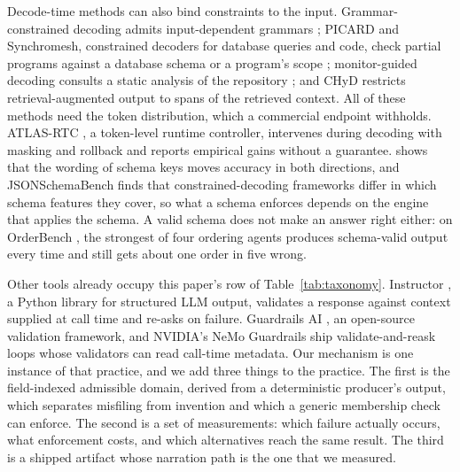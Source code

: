 \documentclass[10pt,twocolumn]{article}
\begin{document}
Decode-time methods can also bind constraints to the input.
Grammar-constrained decoding admits input-dependent grammars \citep{gcd}; PICARD and Synchromesh, constrained decoders for database queries and code, check partial
programs against a database schema or a program's
scope \citep{scholak2021picard,poesia2022synchromesh}; monitor-guided decoding
consults a static analysis of the repository \citep{agrawal2023mgd}; and
CHyD \citep{signe2026chyd} restricts retrieval-augmented output to spans of the
retrieved context. All of these methods need the token distribution, which a
commercial endpoint withholds. ATLAS-RTC \citep{cruz2026atlasrtc}, a
token-level runtime controller, intervenes during decoding with masking and
rollback and reports empirical gains without a guarantee. \citet{le2026schemakey} shows that the
wording of schema keys moves accuracy in both directions, and
JSONSchemaBench \citep{geng2025jsonschemabench} finds that constrained-decoding
frameworks differ in which schema features they cover, so what a schema
enforces depends on the engine that applies the schema. A valid schema does not
make an answer right either: on OrderBench \citep{li2026orderbench}, the
strongest of four ordering agents produces schema-valid output every time and
still gets about one order in five wrong.

Other tools already occupy this paper's row of Table~\ref{tab:taxonomy}.
Instructor \citep{liu2023instructor}, a Python library for structured LLM
output, validates a response against context supplied at call time and re-asks
on failure. Guardrails AI \citep{guardrailsai}, an open-source validation
framework, and NVIDIA's NeMo Guardrails \citep{nemo} ship validate-and-reask
loops whose validators can read call-time metadata. Our mechanism is one
instance of that practice, and we add three things to the practice. The first
is the field-indexed admissible domain, derived from a deterministic
producer's output, which separates misfiling from invention and which a
generic membership check can enforce. The second is a set of measurements:
which failure actually occurs, what enforcement costs, and which alternatives
reach the same result. The third is a shipped artifact whose narration path is
the one that we measured.
\end{document}

